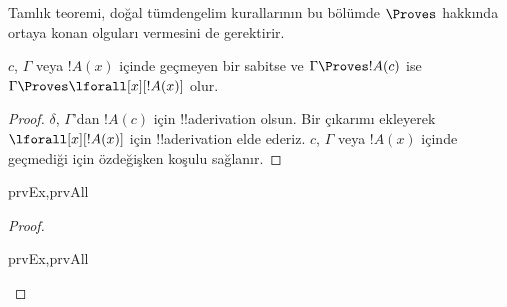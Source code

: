 \documentclass[../../../include/open-logic-section]{subfiles}
\begin{document}


\begin{explain}
  Tamlık teoremi, doğal tümdengelim kurallarının bu bölümde $\Proves$
  hakkında ortaya konan olguları vermesini de gerektirir.
\end{explain}

\begin{thm}
 $c$, $\Gamma$ veya $!A(x)$ içinde
geçmeyen bir sabitse ve $\Gamma \Proves !A(c)$ ise
$\Gamma \Proves \lforall[x][!A(x)]$ olur.
\end{thm}

\begin{proof}
$\delta$, $\Gamma$'dan $!A(c)$ için !!a{derivation} olsun. Bir
\Intro{\lforall} çıkarımı ekleyerek $\lforall[x][!A(x)]$ için
!!a{derivation} elde ederiz. $c$, $\Gamma$ veya $!A(x)$ içinde geçmediği
için özdeğişken koşulu sağlanır.
\end{proof}

\begin{prop}
\begin{tagenumerate}{prvEx,prvAll}

\end{tagenumerate}
\end{prop}

\begin{proof}
\begin{tagenumerate}{prvEx,prvAll}

\end{tagenumerate}
\end{proof}
\end{document}
